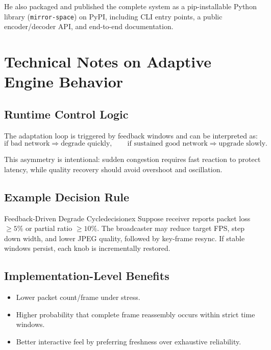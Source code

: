 \documentclass[12pt,a4paper]{article}
\begin{document}
He also packaged and published the complete system as a pip-installable Python library (\texttt{mirror-space}) on PyPI, including CLI entry points, a public encoder/decoder API, and end-to-end documentation.

\newpage

\section{Technical Notes on Adaptive Engine Behavior}

\subsection{Runtime Control Logic}
The adaptation loop is triggered by feedback windows and can be interpreted as:
\[
\text{if bad network} \Rightarrow \text{degrade quickly}, \qquad
\text{if sustained good network} \Rightarrow \text{upgrade slowly}.
\]

This asymmetry is intentional: sudden congestion requires fast reaction to protect latency, while quality recovery should avoid overshoot and oscillation.

\subsection{Example Decision Rule}
\begin{example}{Feedback-Driven Degrade Cycle}{decisionex}
Suppose receiver reports packet loss \(\geq 5\%\) or partial ratio \(\geq 10\%\). The broadcaster may reduce target FPS, step down width, and lower JPEG quality, followed by key-frame resync. If stable windows persist, each knob is incrementally restored.
\end{example}

\subsection{Implementation-Level Benefits}
\begin{itemize}[leftmargin=*, itemsep=4pt]
  \item Lower packet count/frame under stress.
  \item Higher probability that complete frame reassembly occurs within strict time windows.
  \item Better interactive feel by preferring freshness over exhaustive reliability.
\end{itemize}
\end{document}
